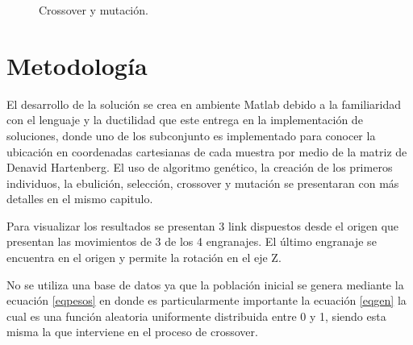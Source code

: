 \documentclass[12pt]{article}
\begin{document}
\begin{figure}
\centering
{}
\label{esteeee1}
\label{esteeee2}
\caption{Crossover y mutación.}
\label{esteeee}
\end{figure}




\section{Metodología}

El desarrollo de la solución se crea en ambiente Matlab debido a la familiaridad con el lenguaje y la ductilidad que este entrega en la implementación de soluciones, donde uno de los subconjunto es implementado para conocer la ubicación en coordenadas cartesianas de cada muestra por medio de la matriz de Denavid Hartenberg. El uso de algoritmo genético, la creación de los primeros individuos, la ebulición, selección, crossover y mutación se presentaran con más detalles en el mismo capitulo.

Para visualizar los resultados se presentan 3 link dispuestos desde el origen que presentan las movimientos de 3 de los 4 engranajes. El último engranaje se encuentra en el origen y permite la rotación en el eje Z.

No se utiliza una base de datos ya que la población inicial se genera mediante la ecuación \eqref{eqpesos} en donde es particularmente importante la ecuación \eqref{eqgen} la cual es una función aleatoria uniformente distribuida entre 0 y 1, siendo esta misma la que interviene en el proceso de crossover.
\end{document}
